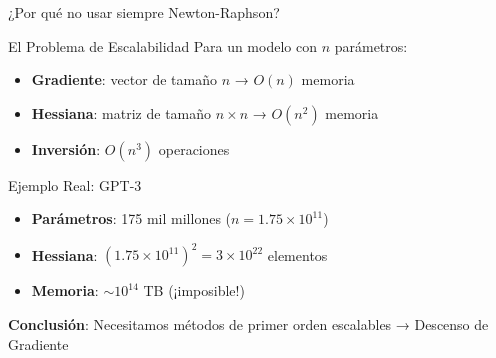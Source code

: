 \documentclass[10pt]{beamer}
\begin{document}
\begin{frame}{¿Por qué no usar siempre Newton-Raphson?}
\begin{alertblock}{El Problema de Escalabilidad}
Para un modelo con $n$ parámetros:
\begin{itemize}
\item \textbf{Gradiente}: vector de tamaño $n$ → $O(n)$ memoria
\item \textbf{Hessiana}: matriz de tamaño $n \times n$ → $O(n^2)$ memoria
\item \textbf{Inversión}: $O(n^3)$ operaciones
\end{itemize}
\end{alertblock}

\begin{exampleblock}{Ejemplo Real: GPT-3}
\begin{itemize}
\item \textbf{Parámetros}: 175 mil millones ($n = 1.75 \times 10^{11}$)
\item \textbf{Hessiana}: $(1.75 \times 10^{11})^2 = 3 \times 10^{22}$ elementos
\item \textbf{Memoria}: $\sim 10^{14}$ TB (¡imposible!)
\end{itemize}
\end{exampleblock}

\vspace{0.3cm}
\textbf{Conclusión}: Necesitamos métodos de primer orden escalables → \textcolor{azulUni}{Descenso de Gradiente}
\end{frame}
\end{document}
